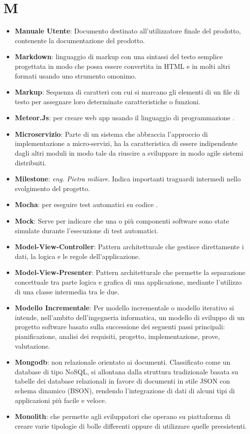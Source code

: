 \section*{M}
\begin{itemize}
	\item
	\textbf{Manuale Utente}: Documento destinato all'utilizzatore finale del prodotto, contenente la documentazione del prodotto.
	\item
	\textbf{Markdown}: linguaggio di markup con una sintassi del testo semplice progettata in modo che possa essere convertita in HTML e in molti altri formati usando uno strumento omonimo.
	\item
	\textbf{Markup}: Sequenza di caratteri con cui si marcano gli elementi di un file di testo per assegnare loro determinate caratteristiche o funzioni.
	\item
	\textbf{Meteor.Js}:  per creare web app usando il linguaggio di programmazione .
	\item
	\textbf{Microservizio}: Parte di un sistema che abbraccia l'approccio di implementazione a micro-servizi, ha la caratteristica di essere indipendente dagli altri moduli in modo tale da riuscire a sviluppare in modo agile sistemi distribuiti.
	\item
	\textbf{Milestone}: \textit{eng. Pietra miliare}. Indica importanti traguardi intermedi nello svolgimento del progetto.
	\item
	\textbf{Mocha}:  per eseguire test automatici su codice .
	\item
	\textbf{Mock}: Serve per indicare che una o più componenti software sono state simulate durante l'esecuzione di test automatici.
	\item
	\textbf{Model-View-Controller}: Pattern architetturale che gestisce direttamente i dati, la logica e le regole dell'applicazione.
	\item
	\textbf{Model-View-Presenter}: Pattern architetturale che permette la separazione concettuale tra parte logica e grafica di una applicazione, mediante l'utilizzo di una classe intermedia tra le due.
	\item
	\textbf{Modello Incrementale}: Per modello incrementale o modello iterativo si intende, nell'ambito dell'ingegneria informatica, un modello di sviluppo di un progetto software basato sulla successione dei seguenti passi principali: pianificazione, analisi dei requisiti, progetto, implementazione, prove, valutazione.
	\item
	\textbf{Mongodb}:  non relazionale orientato ai documenti. Classificato come un database di tipo NoSQL,  si allontana dalla struttura tradizionale basata su tabelle dei database relazionali in favore di documenti in stile JSON con schema dinamico (BSON), rendendo l'integrazione di dati di alcuni tipi di applicazioni più facile e veloce.
	\item
	\textbf{Monolith}:  che permette agli sviluppatori che operano su piattaforma  di creare varie tipologie di bolle differenti oppure di utilizzare quelle preesistenti.
\end{itemize}
\newpage